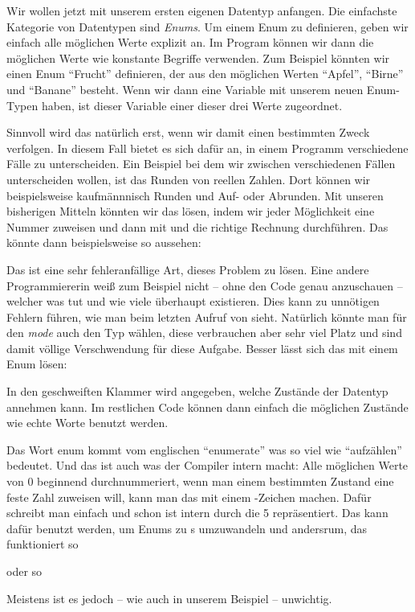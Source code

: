 
Wir wollen jetzt mit unserem ersten eigenen Datentyp anfangen.
Die einfachste Kategorie von Datentypen sind \emph{Enums}.
Um einem Enum zu definieren, geben wir einfach alle möglichen Werte explizit an.
Im Program können wir dann die möglichen Werte wie konstante Begriffe verwenden.
Zum Beispiel könnten wir einen Enum \enquote{Frucht} definieren, der aus den möglichen Werten \enquote{Apfel}, \enquote{Birne} und \enquote{Banane} besteht.
Wenn wir dann eine Variable mit unserem neuen Enum-Typen haben, ist dieser Variable einer dieser drei Werte zugeordnet.

Sinnvoll wird das natürlich erst, wenn wir damit einen bestimmten Zweck verfolgen.
In diesem Fall bietet es sich dafür an, in einem Programm verschiedene Fälle zu unterscheiden.
Ein Beispiel bei dem wir zwischen verschiedenen Fällen unterscheiden wollen, ist das Runden von reellen Zahlen.
Dort können wir beispielsweise kaufmännnisch Runden und Auf- oder Abrunden.
Mit unseren bisherigen Mitteln könnten wir das lösen, indem wir jeder Möglichkeit eine Nummer zuweisen und dann mit  und  die richtige Rechnung durchführen.
Das könnte dann beispielsweise so aussehen:


Das ist eine sehr fehleranfällige Art, dieses Problem zu lösen.
Eine andere Programmiererin weiß zum Beispiel nicht -- ohne den Code genau anzuschauen -- welcher  was tut und wie viele überhaupt existieren.
Dies kann zu unnötigen Fehlern führen, wie man beim letzten Aufruf von  sieht.
Natürlich könnte man für den \emph{mode} auch den Typ  wählen, diese verbrauchen aber sehr viel Platz und sind damit völlige Verschwendung für diese Aufgabe.
Besser lässt sich das mit einem Enum lösen:


In den geschweiften Klammer wird angegeben, welche Zustände der Datentyp annehmen kann.
Im restlichen Code können dann einfach die möglichen Zustände wie echte Worte benutzt werden.

Das Wort enum kommt vom englischen \enquote{enumerate} was so viel wie \enquote{aufzählen} bedeutet.
Und das ist auch was der Compiler intern macht:
Alle möglichen Werte von 0 beginnend durchnummeriert, wenn man einem bestimmten Zustand eine feste Zahl zuweisen will, kann man das mit einem \cppinline{=}-Zeichen machen.
Dafür schreibt man einfach  und schon ist  intern durch die 5 repräsentiert.
Das kann dafür benutzt werden, um Enums zu s umzuwandeln und andersrum, das funktioniert so
\begin{center}
     \qquad oder so \qquad {}   
\end{center}
Meistens ist es jedoch -- wie auch in unserem Beispiel -- unwichtig.

